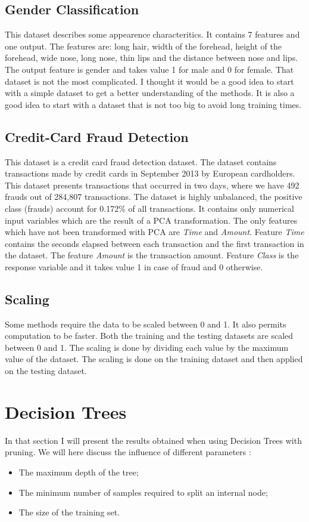 \documentclass[10pt]{article}
\begin{document}
		\subsection*{Gender Classification}
			This dataset describes some appearence characteritics. It contains 7 features and one output. The features are: long hair, width of the forehead, height of the forehead, wide nose, long nose, thin lips and the distance between nose and lips. The output feature is gender and takes value 1 for male and 0 for female. That dataset is not the most complicated. I thought it would be a good idea to start with a simple dataset to get a better understanding of the methods. It is also a good idea to start with a dataset that is not too big to avoid long training times.
		\subsection*{Credit-Card Fraud Detection}
			This dataset is a credit card fraud detection dataset. The dataset contains transactions made by credit cards in September 2013 by European cardholders. This dataset presents transactions that occurred in two days, where we have 492 frauds out of 284,807 transactions. The dataset is highly unbalanced, the positive class (frauds) account for 0.172\% of all transactions. It contains only numerical input variables which are the result of a PCA transformation. The only features which have not been transformed with PCA are \textit{Time} and \textit{Amount}. Feature \textit{Time} contains the seconds elapsed between each transaction and the first transaction in the dataset. The feature \textit{Amount} is the transaction amount. Feature \textit{Class} is the response variable and it takes value 1 in case of fraud and 0 otherwise.
		\subsection*{Scaling}
			Some methods require the data to be scaled between 0 and 1. It also permits computation to be faster. Both the training and the testing datasets are scaled between 0 and 1. The scaling is done by dividing each value by the maximum value of the dataset. The scaling is done on the training dataset and then applied on the testing dataset.
	\section{Decision Trees}
		In that section I will present the results obtained when using Decision Trees with pruning. We will here discuss the influence of different parameters :
		\begin{itemize}
			\item The maximum depth of the tree;
			\item The minimum number of samples required to split an internal node;
			\item The size of the training set.
		\end{itemize}
\end{document}
